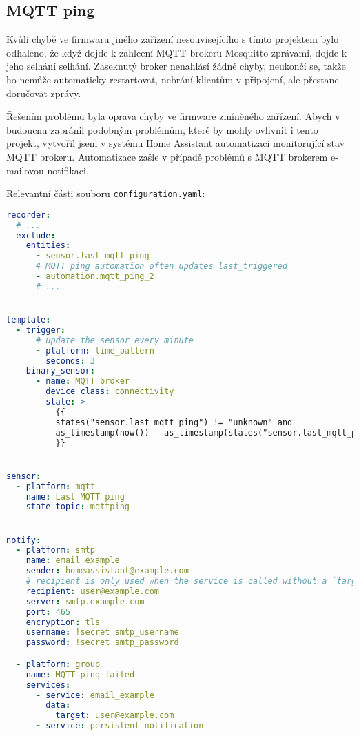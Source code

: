 \subsection{MQTT ping}  %
Kvůli chybě ve firmwaru jiného zařízení nesouvisejícího s tímto projektem
bylo odhaleno, že když dojde k zahlcení MQTT brokeru Mosquitto zprávami, dojde
k jeho selhání selhání. Zaseknutý broker nenahlásí žádné chyby, neukončí se,
takže ho  nemůže automaticky restartovat, nebrání klientům
v připojení, ale přestane doručovat zprávy.

Řešením problému byla oprava chyby ve firmware zmíněného zařízení. Abych
v budoucnu zabránil podobným problémům, které by mohly ovlivnit i tento
projekt, vytvořil jsem v systému Home Assistant automatizaci monitorující stav
MQTT brokeru. Automatizace zašle v případě problémů s MQTT brokerem e-mailovou
notifikaci.

Relevantní části souboru \texttt{configuration.yaml}:
\begin{lstlisting}[language=yaml]
recorder:
  # ...
  exclude:
    entities:
      - sensor.last_mqtt_ping
      # MQTT ping automation often updates last_triggered
      - automation.mqtt_ping_2
      # ...


template:
  - trigger:
      # update the sensor every minute
      - platform: time_pattern
        seconds: 3
    binary_sensor:
      - name: MQTT broker
        device_class: connectivity
        state: >-
          {{
          states("sensor.last_mqtt_ping") != "unknown" and
          as_timestamp(now()) - as_timestamp(states("sensor.last_mqtt_ping")) < 620
          }}


sensor:
  - platform: mqtt
    name: Last MQTT ping
    state_topic: mqttping


notify:
  - platform: smtp
    name: email example
    sender: homeassistant@example.com
    # recipient is only used when the service is called without a `target`
    recipient: user@example.com
    server: smtp.example.com
    port: 465
    encryption: tls
    username: !secret smtp_username
    password: !secret smtp_password

  - platform: group
    name: MQTT ping failed
    services:
      - service: email_example
        data:
          target: user@example.com
      - service: persistent_notification
\end{lstlisting}


